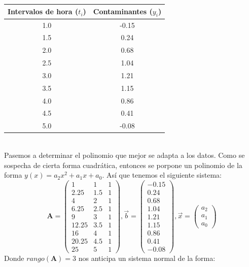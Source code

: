 \documentclass[11pt]{article}
\theoremstyle{definition}
\begin{document}
\begin{enumerate}[(i)]
\begin{table}[ht]
\begin{tabular}{|c|c|}
\hline
\textbf{Intervalos de hora} ($t_{i}$) & \textbf{Contaminantes} ($y_{i}$) \\ \hline
1.0  & -0.15\\ \hline
1.5  & 0.24\\ \hline
2.0  & 0.68\\ \hline
2.5  & 1.04\\ \hline
3.0  & 1.21\\ \hline
3.5  & 1.15\\ \hline
4.0  & 0.86\\ \hline
4.5  & 0.41\\ \hline
5.0  & -0.08\\ \hline
\end{tabular}
\end{table}\\
Pasemos a determinar el polinomio que mejor se adapta a los datos. Como se sospecha de cierta forma cuadr\'atica, entonces se porpone un polinomio de la forma $y(x) = a_{2}x^{2} + a_{1}x + a_{0}$. As\'i que tenemos el siguiente sistema:
\begin{equation*}
\textbf{A} =
\begin{pmatrix}
1 & 1 & 1\\
2.25 & 1.5 & 1\\
4 & 2 & 1\\
6.25 & 2.5 & 1\\
9 & 3 & 1\\
12.25 & 3.5 & 1\\
16 & 4 & 1\\
20.25 & 4.5 & 1\\
25 & 5 & 1
\end{pmatrix}, 
\vec{b} =
\begin{pmatrix}
-0.15\\
0.24\\
0.68\\
1.04\\
1.21\\
1.15\\
0.86\\
0.41\\
-0.08
\end{pmatrix}, 
\vec{x} =
\begin{pmatrix}
a_{2}\\
a_{1}\\
a_{0}
\end{pmatrix}
\end{equation*}
Donde $rango(\textbf{A}) = 3$ nos anticipa un sistema normal de la forma:

\end{enumerate}
\end{document}
